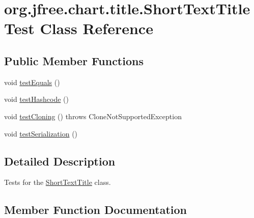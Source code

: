 \hypertarget{classorg_1_1jfree_1_1chart_1_1title_1_1_short_text_title_test}{}\section{org.\+jfree.\+chart.\+title.\+Short\+Text\+Title\+Test Class Reference}
\label{classorg_1_1jfree_1_1chart_1_1title_1_1_short_text_title_test}
\subsection*{Public Member Functions}
\begin{DoxyCompactItemize}
\item 
void \mbox{\hyperlink{classorg_1_1jfree_1_1chart_1_1title_1_1_short_text_title_test_ac087712364e572baab4c112451152eb8}{test\+Equals}} ()
\item 
void \mbox{\hyperlink{classorg_1_1jfree_1_1chart_1_1title_1_1_short_text_title_test_a6a7811a3005a0ad73ebe25182cbdf342}{test\+Hashcode}} ()
\item 
void \mbox{\hyperlink{classorg_1_1jfree_1_1chart_1_1title_1_1_short_text_title_test_a2d56f997103129d7318dd89cbb06422d}{test\+Cloning}} ()  throws Clone\+Not\+Supported\+Exception 
\item 
void \mbox{\hyperlink{classorg_1_1jfree_1_1chart_1_1title_1_1_short_text_title_test_aa006cabfe0c5e41a12bc034a67b2c2ca}{test\+Serialization}} ()
\end{DoxyCompactItemize}


\subsection{Detailed Description}
Tests for the \mbox{\hyperlink{classorg_1_1jfree_1_1chart_1_1title_1_1_short_text_title}{Short\+Text\+Title}} class. 

\subsection{Member Function Documentation}
\mbox{\label{classorg_1_1jfree_1_1chart_1_1title_1_1_short_text_title_test_a2d56f997103129d7318dd89cbb06422d}} 
